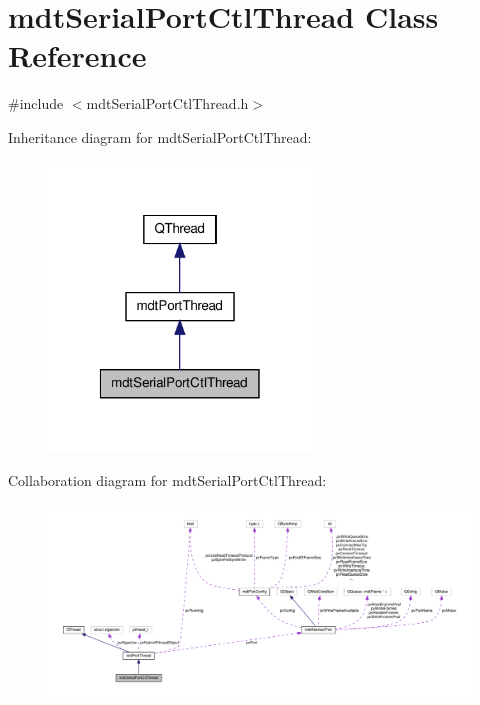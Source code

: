 \hypertarget{classmdt_serial_port_ctl_thread}{\section{mdt\-Serial\-Port\-Ctl\-Thread Class Reference}
\label{classmdt_serial_port_ctl_thread}
}


{\ttfamily \#include $<$mdt\-Serial\-Port\-Ctl\-Thread.\-h$>$}



Inheritance diagram for mdt\-Serial\-Port\-Ctl\-Thread\-:\nopagebreak
\begin{figure}[H]
\begin{center}
\leavevmode
\includegraphics[width=198pt]{classmdt_serial_port_ctl_thread__inherit__graph}
\end{center}
\end{figure}


Collaboration diagram for mdt\-Serial\-Port\-Ctl\-Thread\-:
\nopagebreak
\begin{figure}[H]
\begin{center}
\leavevmode
\includegraphics[width=350pt]{classmdt_serial_port_ctl_thread__coll__graph}
\end{center}
\end{figure}
